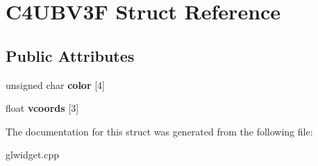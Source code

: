 \hypertarget{struct_c4_u_b_v3_f}{
\section{C4UBV3F Struct Reference}
\label{struct_c4_u_b_v3_f}
}
\subsection*{Public Attributes}
\begin{DoxyCompactItemize}
\item 
\hypertarget{struct_c4_u_b_v3_f_af6a7e78a2f2e724b7755d03d5644b0dc}{
unsigned char {\bfseries color} \mbox{[}4\mbox{]}}
\label{struct_c4_u_b_v3_f_af6a7e78a2f2e724b7755d03d5644b0dc}

\item 
\hypertarget{struct_c4_u_b_v3_f_ae82b7ce1479a879d5bac242d64bc6c3d}{
float {\bfseries vcoords} \mbox{[}3\mbox{]}}
\label{struct_c4_u_b_v3_f_ae82b7ce1479a879d5bac242d64bc6c3d}

\end{DoxyCompactItemize}


The documentation for this struct was generated from the following file:\begin{DoxyCompactItemize}
\item 
glwidget.cpp\end{DoxyCompactItemize}
